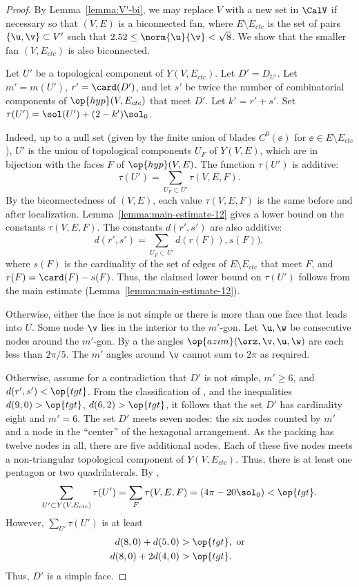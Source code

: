 \begin{proof}
  By Lemma~\ref{lemma:V'-bi}, we may replace $V$ with a new set in
  $\CalV$ if necessary so that $(V,E)$ is a biconnected fan, where
  $E\setminus E_{ctc}$ is the set of pairs $\{\u,\v\}\subset V'$ such
  that $2.52\le\norm{\u}{\v} <\sqrt8$.  We  show that the smaller
  fan $(V,E_{ctc})$ is also biconnected.

  Let $U'$ be a topological component of $Y(V,E_{ctc})$.  Let
  $D'=D_{U'}$.  Let $m'=m(U')$, $r' = \card(D')$, and let $s'$ be
  twice the number of combinatorial components of
  $\op{hyp}(V,E_{ctc})$ that meet $D'$.  Let $k'=r'+s'$.  Set
  $\tau(U') = \sol(U') + (2-k')\sol_0$.

  Indeed,
up to a null set (given by the finite union of blades $C^0(\ee)$ for
$\ee\in E\setminus E_{ctc}$), $U'$ is the union of topological
components $U_F$ of $Y(V,E)$, which are in bijection with the faces
$F$ of $\op{hyp}(V,E)$.  The function $\tau(U')$ is additive:
\[
\tau(U') = \sum_{U_F\subset U'} \tau(V,E,F).
\]
By the biconnectedness of $(V,E)$, each value $\tau(V,E,F)$ is the
same before and after localization.
Lemma~\ref{lemma:main-estimate-12} gives a lower bound on the
constants $\tau(V,E,F)$.  The constants $d(r',s')$ are also additive:
\[
d(r',s') = \sum_{U_F\subset U'} d(r(F)),s(F)),
\]
where $s(F)$ is the cardinality of the set of edges of $E\setminus
E_{ctc}$ that meet $F$, and $r(F) = \card(F)-s(F)$.  Thus, the claimed
lower bound on $\tau(U')$ follows from the main estimate
(Lemma~\ref{lemma:main-estimate-12}).


 Otherwise, either
the face is not simple or there is more than one face that leads into
$U$.  Some node $\v$ lies in the interior to the $m'$-gon.  Let
$\u,\w$ be consecutive nodes around the $m'$-gon.  By a
the angles $\op{azim}(\orz,\v,\u,\w)$ are each less than $2\pi/5$. The
$m'$ angles around $\v$ cannot sum to $2\pi$ as required.

  Otherwise, assume for a contradiction
that $D'$ is not simple, $m'\ge 6$, and $d(r',s')<\op{tgt}$.  From the
classification of \cite[p.~126,~Fig.~12.1]{Hales:2006:DCG}, and the
inequalities $d(9,0) > \op{tgt}$, $d(6,2) > \op{tgt}$, it follows that
the set $D'$ has cardinality eight and $m'=6$.  The set $D'$ meets seven
nodes: the six nodes counted by $m'$ and a node in the ``center'' of
the hexagonal arrangement.  As the packing has twelve nodes in all,
there are five additional nodes.  Each of these five nodes meets a
non-triangular topological component of $Y(V,E_{ctc})$.  Thus, there
is at least one pentagon or two quadrilaterals.  By ,
\[
  \sum_{U'\subset Y(V,E_{ctc})} \tau(U') 
=\sum_F \tau(V,E,F) = (4\pi - 20\sol_0) < \op{tgt}.
\]
However, $\sum_{U'} \tau(U')$ is at least
\begin{align*}
d(8,0) + d(5,0) &> \op{tgt}, \text{ or }\\
d(8,0) + 2 d(4,0) &> \op{tgt}.
\end{align*}
Thus, $D'$ is a simple face.
%
%


\end{proof}
